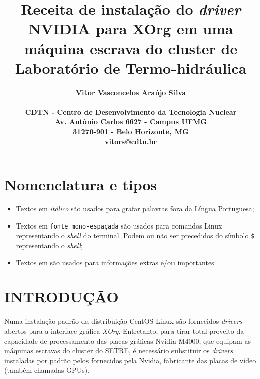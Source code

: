 \documentclass[twoside,a4paper,12pt,english]{inac17}
\title{Receita de instalação do \textit{driver} NVIDIA para XOrg em uma máquina escrava do cluster de Laboratório de Termo-hidráulica}
\author{
  \bf{Vitor Vasconcelos Ara\'ujo Silva}\\ \\
  CDTN - Centro de Desenvolvimento da Tecnologia Nuclear\\
  Av. Ant\^onio Carlos 6627 - Campus UFMG\\
  31270-901 - Belo Horizonte, MG\\
  vitors@cdtn.br}
\begin{document}
\maketitle



\pagestyle{myheadings}
\thispagestyle{empty}
\markboth{}{}


\thispagestyle{empty}

\begin{abstract_full_paper}
\end{abstract_full_paper}

\section*{Nomenclatura e tipos}
\begin{itemize}
\item Textos em \textit{itálico} são usados para grafar palavras fora da Língua Portuguesa;
\item Textos em \texttt{fonte mono-espaçada} são usados para comandos Linux 
representando o \textit{shell} do terminal. Podem ou não ser precedidos do 
símbolo \texttt{\$} representando o \textit{shell};
\item Textos em  são usados para informações extras e/ou importantes
\end{itemize}
\section{INTRODUÇÃO}\label{int}

Numa instalação padrão da distribuição CentOS Linux são fornecidos \textit{drivers} 
abertos para a interface gráfica \textit{XOrg}. Entretanto, para tirar total proveito 
da capacidade de processamento das placas gráficas Nvidia M4000, 
que equipam as máquinas escravas do cluster do SETRE, é necessário 
substituir os \textit{drivers} instaladas por padrão pelos fornecidos pela 
Nvidia, fabricante das placas de vídeo (também chamadas GPUs). 
\end{document}
